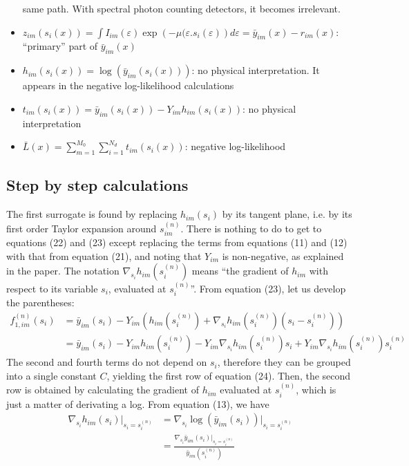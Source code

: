 \documentclass[a4paper, 10pt]{article}
\begin{document}
\begin{itemize}
 same path. With spectral photon counting detectors, it becomes irrelevant.
 \item $z_{im}(s_i(x)) = \int I_{im}(\varepsilon) \exp \left( -\mu(\varepsilon.s_i(\varepsilon)\right) d\varepsilon = \bar{y}_{im}(x) - r_{im}(x)$: ``primary'' part of $\bar{y}_{im}(x)$
 \item $h_{im}(s_i(x)) = \log\left(\bar{y}_{im}(s_i(x))\right) $: no physical interpretation. It appears in the negative log-likelihood calculations
 \item $t_{im}(s_i(x)) = \bar{y}_{im}(s_i(x)) - Y_{im}h_{im}(s_i(x))$: no physical interpretation
 \item $\bar{L}(x) = \sum_{m=1}^{M_0} \sum_{i=1}^{N_d} t_{im}(s_i(x))$: negative log-likelihood 
\end{itemize}

\subsection{Step by step calculations}
The first surrogate is found by replacing $h_{im}(s_i)$ by its tangent plane, i.e. by its first order Taylor expansion around $s_{im}^{(n)}$. There is nothing to do 
to get to equations (22) and (23) except replacing the terms from equations (11) and (12) with that from equation (21), and noting that $Y_{im}$ is non-negative, as 
explained in the paper. The notation $\nabla_{s_i} h_{im} \left( s_i^{(n)} \right)$ means ``the gradient of $h_{im}$ with respect to its variable $s_i$, evaluated at $s_i^{(n)}$''.
From equation (23), let us develop the parentheses:
\begin{equation*}
 \begin{split}
  f_{1, im}^{(n)}(s_i) &= \bar{y}_{im}(s_i) - Y_{im} \left( h_{im} (s_i^{(n)}) + \nabla_{s_i} h_{im} (s_i^{(n)}) (s_i - s_i^{(n)} )\right) \\
		       &= \bar{y}_{im}(s_i) - Y_{im} h_{im} (s_i^{(n)}) - Y_{im} \nabla_{s_i} h_{im} (s_i^{(n)}) s_i + Y_{im} \nabla_{s_i} h_{im} (s_i^{(n)}) s_i^{(n)}
 \end{split}
\end{equation*}
The second and fourth terms do not depend on $s_i$, therefore they can be grouped into a single constant $C$, yielding the first row of equation (24).
Then, the second row is obtained by calculating the gradient of $h_{im}$ evaluated at $s_i^{(n)}$, which is just a matter of derivating a log.  From equation (13), we have
\begin{equation*}
 \begin{split}
  \nabla_{s_i} h_{im}(s_i)\Bigr|_{s_i = s_i^{(n)}} &= \nabla_{s_i} \log \left( \bar{y}_{im}(s_i) \right)\Bigr|_{s_i = s_i^{(n)}}\\
  &= \frac{\nabla_{s_i} \bar{y}_{im}(s_i)\Bigr|_{s_i = s_i^{(n)}}}{\bar{y}_{im} ( s_i^{(n)} ) }
 \end{split}
\end{equation*}
\end{document}
